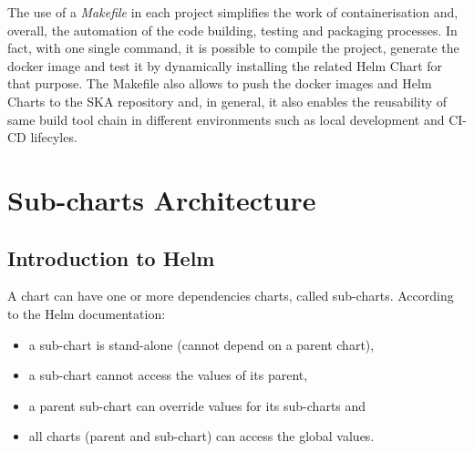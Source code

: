 \documentclass[a4paper]{spie}  %
\begin{document}
The use of a \textit{Makefile} in each project simplifies the work of containerisation and, overall, the automation of the code building, testing and packaging processes. In fact, with one single command, it is possible to compile the project, generate the docker image and test it by dynamically installing the related Helm Chart for that purpose.
The Makefile also allows to push the docker images and Helm Charts to the SKA repository and, in general, it also enables the reusability of same build tool chain in different environments such as local development and CI-CD lifecyles.




\section{Sub-charts Architecture}

\subsection{Introduction to Helm}
A chart can have one or more dependencies charts, called sub-charts. According to the Helm documentation:
\begin{itemize}
    \item a sub-chart is stand-alone (cannot depend on a parent chart),
    \item a sub-chart cannot access the values of its parent,
    \item a parent sub-chart can override values for its sub-charts and
    \item all charts (parent and sub-chart) can access the global values.
\end{itemize}
\end{document}
